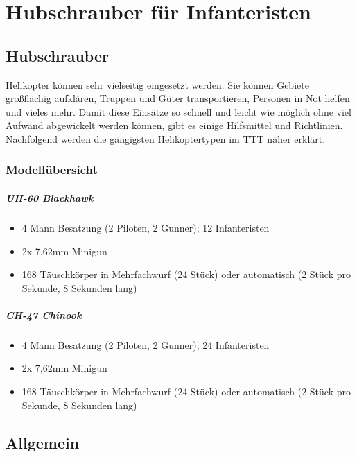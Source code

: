 \chapter{Hubschrauber für Infanteristen}
\label{HuFIn}
\section{Hubschrauber}
	Helikopter können sehr vielseitig eingesetzt werden. Sie können Gebiete großflächig aufklären, Truppen und Güter transportieren, Personen in Not helfen und vieles mehr. Damit diese Einsätze so schnell und leicht wie möglich ohne viel Aufwand abgewickelt werden können, gibt es einige Hilfsmittel und Richtlinien. Nachfolgend werden die gängigsten Helikoptertypen im TTT näher erklärt. 
\subsection{Modellübersicht}
\paragraph*{UH-60 Blackhawk}
	\begin{itemize}
		\item 4 Mann Besatzung (2 Piloten, 2 Gunner); 12 Infanteristen 
		\item 2x 7,62mm Minigun 
		\item 168 Täuschkörper in Mehrfachwurf (24 Stück) oder automatisch (2 Stück pro 
		Sekunde, 8 Sekunden lang) 
	\end{itemize}
\paragraph*{CH-47 Chinook}
	\begin{itemize}
		\item 4 Mann Besatzung (2 Piloten, 2 Gunner); 24 Infanteristen 
		\item 2x 7,62mm Minigun 
		\item 168 Täuschkörper in Mehrfachwurf (24 Stück) oder automatisch (2 Stück pro 
		Sekunde, 8 Sekunden lang) 
	\end{itemize}

\section{Allgemein}
